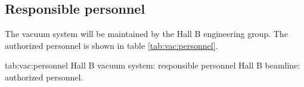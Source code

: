 \begin{safetyen}{10}{15}
\subsection{Responsible  personnel} 
\end{safetyen}
The vacuum system will be maintained by the Hall B engineering group. The authorized personnel is shown in table \ref{tab:vac:personnel}.
\begin{namestab}{tab:vac:personnel}{ Hall B vacuum system: responsible personnel}{%
       Hall B beamline: authorized personnel.}
\end{namestab}


